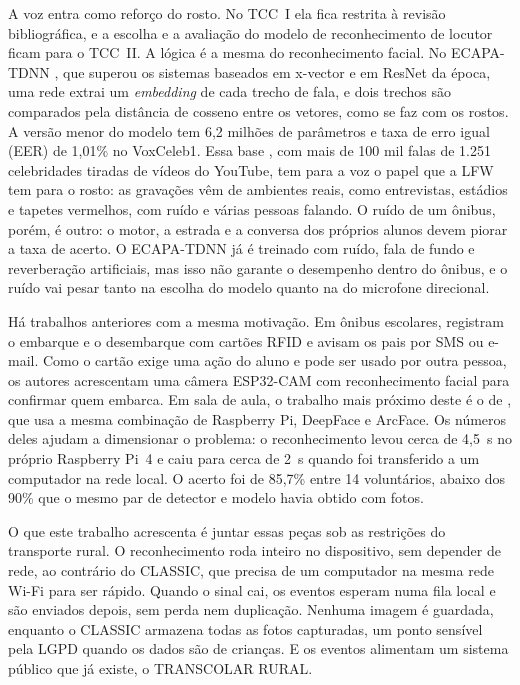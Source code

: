 \documentclass[
    12pt,
    oneside,
    a4paper,
    article,
    english,
    brazil
    ]{abntex2}
\begin{document}
A voz entra como reforço do rosto. No TCC~I ela fica restrita à revisão
bibliográfica, e a escolha e a avaliação do modelo de reconhecimento de
locutor ficam para o TCC~II. A lógica é a mesma do reconhecimento facial. No
ECAPA-TDNN \cite{desplanques2020ecapa}, que superou os sistemas baseados em
x-vector e em ResNet da época, uma rede extrai um \textit{embedding} de cada
trecho de fala, e dois trechos são comparados pela distância de cosseno entre
os vetores, como se faz com os rostos. A versão menor do modelo tem
6,2 milhões de parâmetros e taxa de erro igual (EER) de 1,01\% no VoxCeleb1.
Essa base \cite{nagrani2017voxceleb}, com mais de 100 mil falas de 1.251
celebridades tiradas de vídeos do YouTube, tem para a voz o papel que a LFW
tem para o rosto: as gravações vêm de ambientes reais, como entrevistas,
estádios e tapetes vermelhos, com ruído e várias pessoas falando. O ruído de
um ônibus, porém, é outro: o motor, a estrada e a conversa dos próprios
alunos devem piorar a taxa de acerto. O ECAPA-TDNN já é treinado com ruído,
fala de fundo e reverberação artificiais, mas isso não garante o desempenho
dentro do ônibus, e o ruído vai pesar tanto na escolha do modelo quanto na do
microfone direcional.

Há trabalhos anteriores com a mesma motivação. Em ônibus escolares,
 registram o embarque e o desembarque com cartões
RFID e avisam os pais por SMS ou e-mail. Como o cartão exige uma ação do aluno
e pode ser usado por outra pessoa, os autores acrescentam uma câmera ESP32-CAM
com reconhecimento facial para confirmar quem embarca. Em sala de aula, o trabalho mais próximo deste é o de
, que usa a mesma combinação de Raspberry Pi,
DeepFace e ArcFace. Os números deles ajudam a dimensionar o problema: o
reconhecimento levou cerca de 4,5~s no próprio Raspberry Pi~4 e caiu para
cerca de 2~s quando foi transferido a um computador na rede local. O acerto
foi de 85,7\% entre 14 voluntários, abaixo dos 90\% que o mesmo par de detector
e modelo havia obtido com fotos.

O que este trabalho acrescenta é juntar essas peças sob as restrições do
transporte rural. O reconhecimento roda inteiro no dispositivo, sem depender
de rede, ao contrário do CLASSIC, que precisa de um computador na mesma rede
Wi-Fi para ser rápido. Quando o sinal cai, os eventos esperam numa fila local
e são enviados depois, sem perda nem duplicação. Nenhuma imagem é guardada,
enquanto o CLASSIC armazena todas as fotos capturadas, um ponto sensível pela
LGPD quando os dados são de crianças. E os eventos alimentam um sistema
público que já existe, o TRANSCOLAR RURAL.
\end{document}

